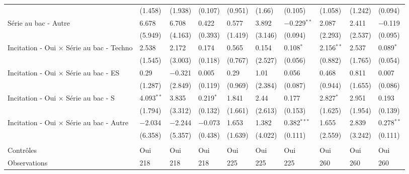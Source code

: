 \documentclass[
]{book}
\begin{document}
\begin{landscape}
\begin{ThreePartTable}
\begin{longtable}[t]{llllllllll}
\hspace{1em} & (1.458) & (1.938) & (0.107) & (0.951) & (1.66) & (0.105) & (1.058) & (1.242) & (0.094)\\
\hspace{1em}Série au bac - Autre & 6.678 & 6.708 & 0.422 & 0.577 & 3.892 & $-$0.229$^{**}$ & 2.087 & 2.411 & $-$0.119\\
\hspace{1em} & (5.949) & (4.163) & (0.393) & (1.419) & (3.146) & (0.094) & (2.293) & (2.537) & (0.095)\\
\hspace{1em}Incitation - Oui $\times$ Série au bac - Techno & 2.538 & 2.172 & 0.174 & 0.565 & 0.154 & 0.108$^{*}$ & 2.156$^{**}$ & 2.537 & 0.089$^{*}$\\
\hspace{1em} & (1.545) & (3.003) & (0.118) & (0.767) & (2.527) & (0.056) & (0.882) & (1.765) & (0.054)\\
\hspace{1em}Incitation - Oui $\times$ Série au bac - ES & 0.29 & $-$0.321 & 0.005 & 0.29 & 1.01 & 0.056 & 0.468 & 0.811 & 0.007\\
\hspace{1em} & (1.287) & (2.849) & (0.119) & (0.969) & (2.384) & (0.087) & (0.944) & (1.655) & (0.086)\\
\hspace{1em}Incitation - Oui $\times$ Série au bac - S & 4.093$^{**}$ & 3.835 & 0.219$^{*}$ & 1.841 & 2.44 & 0.177 & 2.827$^{*}$ & 2.951 & 0.193\\
\hspace{1em} & (1.794) & (3.312) & (0.132) & (1.661) & (2.613) & (0.153) & (1.625) & (1.954) & (0.139)\\
\hspace{1em}Incitation - Oui $\times$ Série au bac - Autre & $-$2.034 & $-$2.244 & $-$0.073 & 1.653 & 1.382 & 0.382$^{***}$ & 1.655 & 2.839 & 0.278$^{**}$\\
\hspace{1em} & (6.358) & (5.357) & (0.438) & (1.639) & (4.022) & (0.111) & (2.559) & (3.242) & (0.111)\\
\hspace{1em} &  &  &  &  &  &  &  &  \vphantom{8} & \\
\hspace{1em}Contrôles & Oui & Oui & Oui & Oui & Oui & Oui & Oui & Oui & \vphantom{4} Oui\\
\hspace{1em}Observations & 218 & 218 & 218 & 225 & 225 & 225 & 260 & 260 & \vphantom{4} 260\\

\end{longtable}
\end{ThreePartTable}
\end{landscape}
\end{document}
